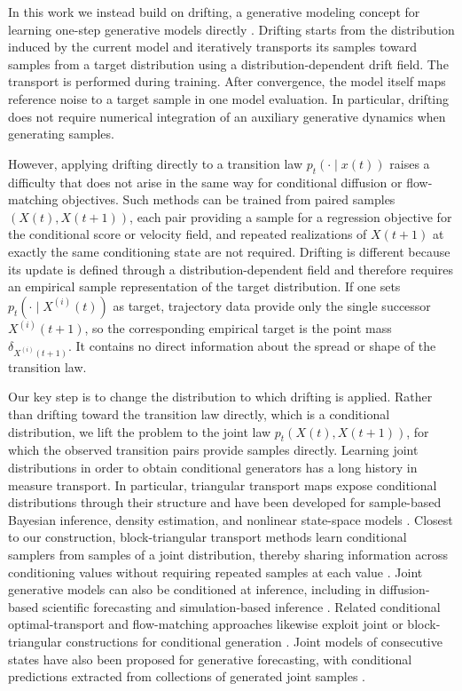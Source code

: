 \documentclass[oneside,11pt]{article}
\theoremstyle{remark}
\begin{document}
In this work we instead build on drifting, a generative modeling concept for learning one-step generative models directly \cite{deng2026drifting,han2026wflow,turan2026generativedriftingsecretlyscore,lai2026unifiedviewdriftingscorebased}. Drifting starts from the distribution induced by the current model and iteratively transports its samples toward samples from a target distribution using a distribution-dependent drift field. The transport is performed during training. After convergence, the model itself maps reference noise to a target sample in one model evaluation. In particular, drifting does not require numerical integration of an auxiliary generative dynamics when generating samples. 

However, applying drifting directly to a transition law $p_t(\cdot\mid x(t))$ raises a difficulty that does not arise in the same way for conditional diffusion or flow-matching objectives.
Such methods can be trained from paired samples $(X(t),X(t+1))$, each pair providing a sample for a regression objective for the conditional score or velocity field, and repeated realizations of $X(t+1)$ at exactly the same conditioning state are not required.
Drifting is different because its update is defined through a distribution-dependent field and therefore requires an empirical sample representation of the target distribution. If one sets $p_t(\cdot\mid X^{(i)}(t))$ as target, trajectory data provide only the single successor $X^{(i)}(t+1)$, so the corresponding empirical target is the point mass $\delta_{X^{(i)}(t+1)}$. It contains no direct information about the spread or shape of the transition law.

Our key step is to change the distribution to which drifting is applied. Rather than drifting toward the transition law directly, which is a conditional distribution, we lift the problem to the joint law $p_t(X(t),X(t+1))$, for which the observed transition pairs provide samples directly. Learning joint distributions in order to obtain conditional generators has a long history in measure transport. In particular, triangular transport maps expose conditional distributions through their structure and have been developed for sample-based Bayesian inference, density estimation, and nonlinear state-space models \cite{Marzouk2017,JMLR:v19:17-747,doi:10.1137/20M1312204,Baptista2024}. Closest to our construction, block-triangular transport methods learn conditional samplers from samples of a joint distribution, thereby sharing information across conditioning values without requiring repeated samples at each value \cite{baptista2024conditional}. Joint generative models can also be conditioned at inference, including in diffusion-based scientific forecasting and simulation-based inference \cite{shysheya2024conditional,gloeckler2024allinone}. Related conditional optimal-transport and flow-matching approaches likewise exploit joint or block-triangular constructions for conditional generation \cite{kerrigan2024dynamic,zhai2026conditional}. Joint models of consecutive states have also been proposed for generative forecasting, with conditional predictions extracted from collections of generated joint samples \cite{wyrod2026generative}.
\end{document}
